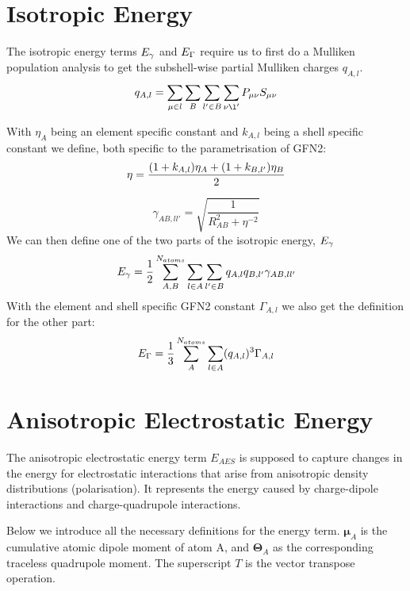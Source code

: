 \section{Isotropic Energy}
The isotropic energy terms $\E{\gamma}$ and $\E{\Gamma}$ require us to first do a Mulliken population analysis to get the subshell-wise partial Mulliken charges $q_{A,l}$.
\begin{equation}
    q_{A,l} = \sum_{\mu\in l}\sum_B\sum_{l'\in B}\sum_{\nu\l'}P_{\mu\nu}S_{\mu\nu}\\
\end{equation}

With $\eta_A$ being an element specific constant and $k_{A,l}$ being a shell specific constant we define, both specific to the parametrisation of GFN2:
\begin{equation}
    \eta = \frac{(1+k_{A,l})\eta_A+(1+k_{B,l'})\eta_B}{2}\\
\end{equation}

\begin{equation}
    \gamma_{AB,ll'} = \sqrt{\frac{1}{R_{AB}^2+\eta^{-2}}}
\end{equation}
We can then define one of the two parts of the isotropic energy, $\E{\gamma}$
\begin{equation}
    \E{\gamma} = \frac{1}{2}\sum_{A,B}^{N_{atoms}}\sum_{l\in A}\sum_{l'\in B}q_{A,l}q_{B,l'}\gamma_{AB,ll'}\label{eq:gamma}
\end{equation}
With the element and shell specific GFN2 constant $\Gamma_{A,l}$ we also get the definition for the other part:
\begin{equation}
    \E{\Gamma} = \frac{1}{3}\sum_A^{N_{atoms}}\sum_{l\in A}(q_{A,l})^3\Gamma_{A,l} \label{eq:Gamma}
\end{equation}



\section{Anisotropic Electrostatic Energy} \label{sec:AES}

The anisotropic electrostatic energy term $E_{AES}$ is supposed to capture changes in the energy for electrostatic interactions that arise from anisotropic density distributions (polarisation). It represents the energy caused by charge-dipole interactions and charge-quadrupole interactions.

Below we introduce all the necessary definitions for the energy term.
$\pmb{\mu}_A$ is the cumulative atomic dipole moment of atom A, and $\pmb{\Theta}_A$ as the corresponding traceless quadrupole moment. The superscript $T$ is the vector transpose operation.

